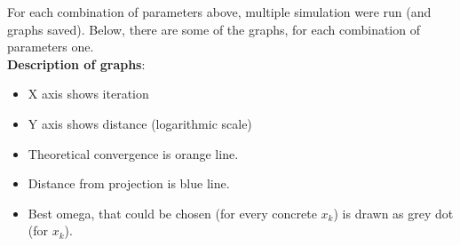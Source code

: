 \documentclass[11pt]{book}
\begin{document}
For each combination of parameters above, multiple simulation were run (and graphs saved). Below, there are some of the graphs, for each combination of parameters one.\\

\newpage
\textbf{Description of graphs}:
\begin{itemize}[noitemsep]
\item X axis shows iteration
\item Y axis shows distance (logarithmic scale)
\item Theoretical convergence is orange line.
\item Distance from projection is blue line.
\item Best omega, that could be chosen (for every concrete $x_k$) is drawn as grey dot (for $x_k$).
\end{itemize}
\end{document}

